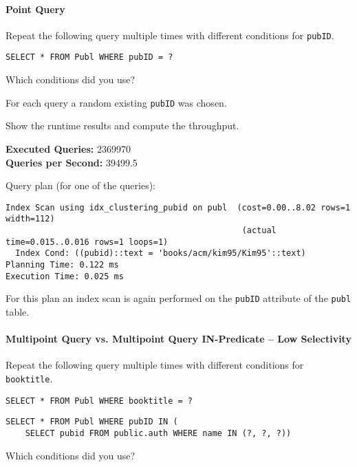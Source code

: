 \documentclass[11pt]{scrartcl}
\begin{document}
\paragraph{Point Query}

Repeat the following query multiple times with different conditions for \texttt{pubID}.

\begin{lstlisting}[style=dbtsql]
SELECT * FROM Publ WHERE pubID = ?
\end{lstlisting}

Which conditions did you use?

For each query a random existing \texttt{pubID} was chosen.

Show the runtime results and compute the throughput.

\textbf{Executed Queries: } 2369970\\
\textbf{Queries per Second: } 39499.5

Query plan (for one of the queries):

{\small
\parskip0pt\begin{verbatim}
Index Scan using idx_clustering_pubid on publ  (cost=0.00..8.02 rows=1 width=112)
                                                (actual time=0.015..0.016 rows=1 loops=1)
  Index Cond: ((pubid)::text = 'books/acm/kim95/Kim95'::text)
Planning Time: 0.122 ms
Execution Time: 0.025 ms
\end{verbatim}}

For this plan an index scan is again performed on the \texttt{pubID} attribute of the \texttt{publ} table.

\paragraph{Multipoint Query vs. Multipoint Query IN-Predicate -- Low Selectivity}

Repeat the following query multiple times with different conditions for \texttt{booktitle}.

\begin{lstlisting}[style=dbtsql]
SELECT * FROM Publ WHERE booktitle = ?
\end{lstlisting}

\begin{lstlisting}[style=dbtsql]
SELECT * FROM Publ WHERE pubID IN (
    SELECT pubid FROM public.auth WHERE name IN (?, ?, ?))
\end{lstlisting}


Which conditions did you use?
\end{document}
